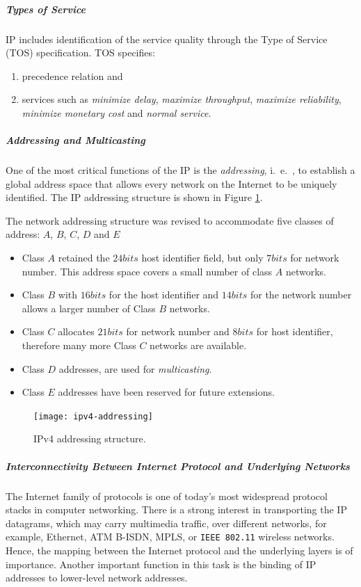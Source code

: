 \subparagraph{Types of Service}
IP includes identification of the service quality through the Type of Service (TOS) specification. TOS specifies:
\begin{enumerate}
	\item precedence relation and
	\item services such as \textit{minimize delay},
	\textit{maximize throughput}, \textit{maximize reliability},\textit{ minimize monetary cost} and \textit{normal service}.
\end{enumerate}


\subparagraph{Addressing and Multicasting}
One of the most critical functions of the IP is the \textit{addressing}, i.\ e.\ , to establish a global address space that allows every network on the Internet to be uniquely identified. The IP	addressing structure is shown in Figure \ref{fig:ipv4-addressing}.

The network addressing structure was revised to accommodate five classes of address: $ A $, $ B $, $ C $, $ D $ and $ E $
\begin{itemize}
	\item Class $ A $ retained the $ 24bits $ host identifier field, but only $ 7bits $ for	network number. This address space covers a small number of class $ A  $ networks. 
	
	\item Class	$ B $ with $ 16 bits $ for the host identifier and $ 14 bits $ for the network number allows a larger number of Class $ B $ networks. 
	\item Class $ C $ allocates $ 21 bits $ for network number and $ 8bits $ for host identifier, therefore many more Class $ C $ networks are available. 
	
	\item Class $ D $ addresses, are used for \textit{multicasting}.
	\item Class $ E $ addresses have been reserved for future extensions.
\end{itemize}
\begin{figure}[pht]
	\centering
	\texttt{[image: ipv4-addressing]}
	\caption{IPv4 addressing structure.}\label{fig:ipv4-addressing}
\end{figure}


\subparagraph{Interconnectivity Between Internet Protocol and Underlying Networks}
The Internet family of protocols is one of today's most widespread protocol stacks in computer networking. There is a strong interest in transporting the IP datagrams, which may carry multimedia traffic, over different networks, for example, Ethernet, ATM B-ISDN, MPLS, or \texttt{IEEE 802.11} wireless networks. Hence, the mapping between the Internet protocol and the underlying layers is of importance. Another important function in this task is the binding of IP addresses to lower-level network addresses.


